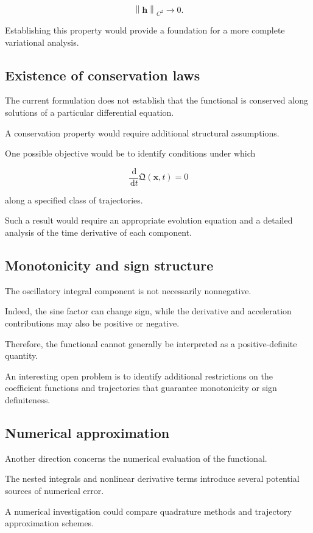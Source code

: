 \documentclass[12pt]{article}
\numberwithin{equation}{section}
\newcommand{\norm}[1]{\left\lVert #1 \right\rVert}
\newcommand{\Q}{\mathfrak{Q}}
\newcommand{\dd}{\,\mathrm{d}}
\theoremstyle{definition}
\theoremstyle{remark}
\begin{document}
\[
\norm{\mathbf{h}}_{C^2}\to0.
\]

Establishing this property would provide
a foundation for a more complete
variational analysis.

\subsection{Existence of conservation laws}

The current formulation does not establish
that the functional is conserved along
solutions of a particular differential equation.

A conservation property would require
additional structural assumptions.

One possible objective would be to identify
conditions under which

\[
\frac{\dd}{\dd t}
\Q(\mathbf{x},t)=0
\]

along a specified class of trajectories.

Such a result would require an appropriate
evolution equation and a detailed analysis
of the time derivative of each component.

\subsection{Monotonicity and sign structure}

The oscillatory integral component is not
necessarily nonnegative.

Indeed, the sine factor can change sign,
while the derivative and acceleration
contributions may also be positive or negative.

Therefore, the functional cannot generally
be interpreted as a positive-definite quantity.

An interesting open problem is to identify
additional restrictions on the coefficient
functions and trajectories that guarantee
monotonicity or sign definiteness.

\subsection{Numerical approximation}

Another direction concerns the numerical
evaluation of the functional.

The nested integrals and nonlinear
derivative terms introduce several
potential sources of numerical error.

A numerical investigation could compare
quadrature methods and trajectory
approximation schemes.
\end{document}
